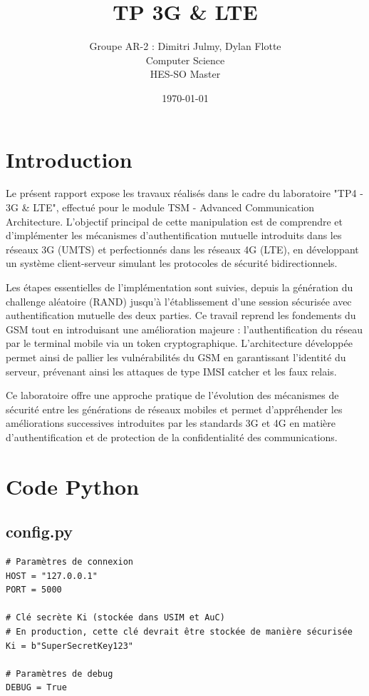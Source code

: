 \documentclass[12pt,a4paper]{report}
\title{
    \vspace{2cm}
    \textbf{\Huge TP 3G \& LTE} \\
    \vspace{0.5cm}
}
\author{
    Groupe AR-2 : Dimitri Julmy, Dylan Flotte \\
    Computer Science \\
    HES-SO Master
}
\date{\today}
\begin{document}
\maketitle
\thispagestyle{empty}
\newpage

\newpage

\tableofcontents
\newpage

\chapter*{Introduction}

Le présent rapport expose les travaux réalisés dans le cadre du laboratoire "TP4 - 3G \& LTE", effectué pour le module TSM - Advanced Communication Architecture. L'objectif principal de cette manipulation est de comprendre et d'implémenter les mécanismes d'authentification mutuelle introduits dans les réseaux 3G (UMTS) et perfectionnés dans les réseaux 4G (LTE), en développant un système client-serveur simulant les protocoles de sécurité bidirectionnels.

Les étapes essentielles de l'implémentation sont suivies, depuis la génération du challenge aléatoire (RAND) jusqu'à l'établissement d'une session sécurisée avec authentification mutuelle des deux parties. Ce travail reprend les fondements du GSM tout en introduisant une amélioration majeure : l'authentification du réseau par le terminal mobile via un token cryptographique. L'architecture développée permet ainsi de pallier les vulnérabilités du GSM en garantissant l'identité du serveur, prévenant ainsi les attaques de type IMSI catcher et les faux relais.

Ce laboratoire offre une approche pratique de l'évolution des mécanismes de sécurité entre les générations de réseaux mobiles et permet d'appréhender les améliorations successives introduites par les standards 3G et 4G en matière d'authentification et de protection de la confidentialité des communications.

\chapter{Code Python}

\section{config.py}
\begin{verbatim}
# Paramètres de connexion
HOST = "127.0.0.1"
PORT = 5000

# Clé secrète Ki (stockée dans USIM et AuC)
# En production, cette clé devrait être stockée de manière sécurisée
Ki = b"SuperSecretKey123"

# Paramètres de debug
DEBUG = True

\end{verbatim}
\end{document}
